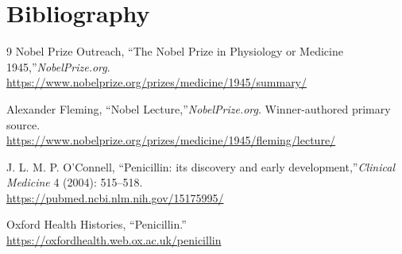 \section{Bibliography}

\begin{thebibliography}{9}
Nobel Prize Outreach, ``The Nobel Prize in Physiology or Medicine 1945,''\emph{NobelPrize.org}.\\
\url{https://www.nobelprize.org/prizes/medicine/1945/summary/}

Alexander Fleming, ``Nobel Lecture,''\emph{NobelPrize.org}. Winner-authored primary source.\\
\url{https://www.nobelprize.org/prizes/medicine/1945/fleming/lecture/}

J. L. M. P. O'Connell, ``Penicillin: its discovery and early development,''\emph{Clinical Medicine} 4 (2004): 515--518.\\
\url{https://pubmed.ncbi.nlm.nih.gov/15175995/}

Oxford Health Histories, ``Penicillin.''\\
\url{https://oxfordhealth.web.ox.ac.uk/penicillin}
\end{thebibliography}
